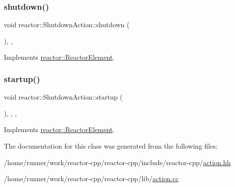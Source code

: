 \mbox{\label{classreactor_1_1ShutdownAction_a8950ffd9b67f4800b75a95af92c4fd2a}} 
\subsubsection{\texorpdfstring{shutdown()}{shutdown()}}
{\footnotesize\ttfamily void reactor\+::\+Shutdown\+Action\+::shutdown (\begin{DoxyParamCaption}{ }\end{DoxyParamCaption})\hspace{0.3cm}{\ttfamily [final]}, {\ttfamily [override]}, {\ttfamily [virtual]}}



Implements \hyperlink{classreactor_1_1ReactorElement_a8fce084bef582156979ebba56737e907}{reactor\+::\+Reactor\+Element}.

\mbox{\label{classreactor_1_1ShutdownAction_a21c23857012b384cd06f55e002291824}} 
\subsubsection{\texorpdfstring{startup()}{startup()}}
{\footnotesize\ttfamily void reactor\+::\+Shutdown\+Action\+::startup (\begin{DoxyParamCaption}{ }\end{DoxyParamCaption})\hspace{0.3cm}{\ttfamily [inline]}, {\ttfamily [final]}, {\ttfamily [override]}, {\ttfamily [virtual]}}



Implements \hyperlink{classreactor_1_1ReactorElement_a8cb574cb20ff963903ad905fb0a157e3}{reactor\+::\+Reactor\+Element}.



The documentation for this class was generated from the following files\+:\begin{DoxyCompactItemize}
\item 
/home/runner/work/reactor-\/cpp/reactor-\/cpp/include/reactor-\/cpp/\hyperlink{action_8hh}{action.\+hh}\item 
/home/runner/work/reactor-\/cpp/reactor-\/cpp/lib/\hyperlink{action_8cc}{action.\+cc}\end{DoxyCompactItemize}
